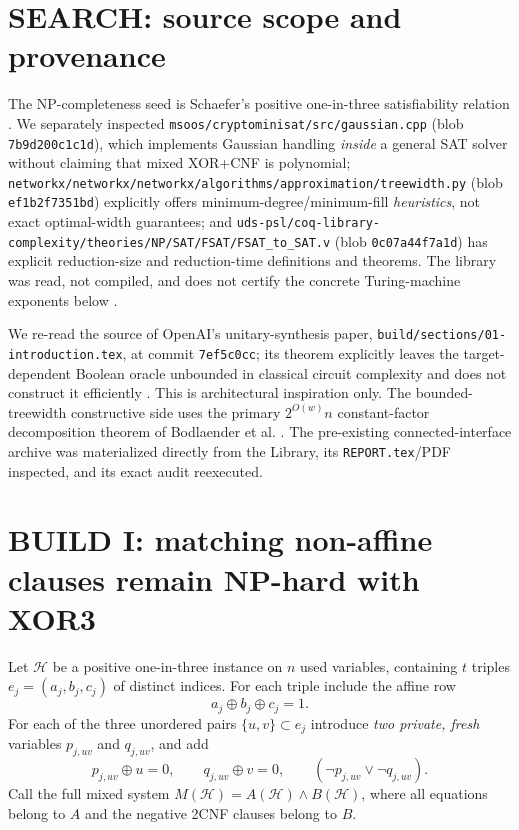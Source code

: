 \documentclass[11pt]{article}
\begin{document}
\section{SEARCH: source scope and provenance}
The NP-completeness seed is Schaefer's positive one-in-three satisfiability relation \cite{schaefer1978}. We separately inspected \texttt{msoos/cryptominisat/src/gaussian.cpp} (blob \texttt{7b9d200c1c1d}), which implements Gaussian handling \emph{inside} a general SAT solver without claiming that mixed XOR+CNF is polynomial; \texttt{networkx/networkx/networkx/algorithms/approximation/treewidth.py} (blob \texttt{ef1b2f7351bd}) explicitly offers minimum-degree/minimum-fill \emph{heuristics}, not exact optimal-width guarantees; and \texttt{uds-psl/coq-library-complexity/theories/NP/SAT/FSAT/FSAT\_to\_SAT.v} (blob \texttt{0c07a44f7a1d}) has explicit reduction-size and reduction-time definitions and theorems. The library was read, not compiled, and does not certify the concrete Turing-machine exponents below \cite{gauss,coq}.

We re-read the source of OpenAI's unitary-synthesis paper, \texttt{build/sections/01-introduction.tex}, at commit \texttt{7ef5c0cc}; its theorem explicitly leaves the target-dependent Boolean oracle unbounded in classical circuit complexity and does not construct it efficiently \cite{openai}. This is architectural inspiration only. The bounded-treewidth constructive side uses the primary $2^{O(w)}n$ constant-factor decomposition theorem of Bodlaender et al. \cite{bdetal}. The pre-existing connected-interface archive was materialized directly from the Library, its \texttt{REPORT.tex}/PDF inspected, and its exact audit reexecuted.

\section{BUILD I: matching non-affine clauses remain NP-hard with XOR3}
Let $\mathcal H$ be a positive one-in-three instance on $n$ used variables, containing $t$ triples $e_j=(a_j,b_j,c_j)$ of distinct indices. For each triple include the affine row
\begin{equation}\label{eq:odd}
 a_j\oplus b_j\oplus c_j=1.
\end{equation}
For each of the three unordered pairs $\{u,v\}\subset e_j$ introduce \emph{two private, fresh} variables $p_{j,uv}$ and $q_{j,uv}$, and add
\begin{equation}\label{eq:copy}
 p_{j,uv}\oplus u=0,\qquad q_{j,uv}\oplus v=0,\qquad
 (\neg p_{j,uv}\vee\neg q_{j,uv}).
\end{equation}
Call the full mixed system $M(\mathcal H)=A(\mathcal H)\wedge B(\mathcal H)$, where all equations belong to $A$ and the negative 2CNF clauses belong to $B$.
\end{document}

